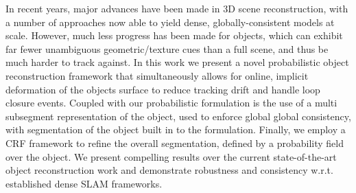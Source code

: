 In recent years, major advances have been made in 3D scene reconstruction, with a number of approaches now able to yield dense, globally-consistent models at scale. However, much less progress has been made for objects, which can exhibit far fewer unambiguous geometric/texture cues than a full scene, and thus be much harder to track against.
In this work we present a novel probabilistic object reconstruction framework that simultaneously allows for online, implicit deformation of the objects surface to reduce tracking drift and handle 
loop closure events. Coupled with our probabilistic formulation is the use of a multi subsegment representation of the object, used to enforce global global consistency, with segmentation of the object 
built in to the formulation. Finally, we employ a CRF framework to refine the overall segmentation, defined by a probability field over the object. We present compelling results over the current state-of-the-art 
object reconstruction work and demonstrate robustness and consistency w.r.t. established dense SLAM frameworks.